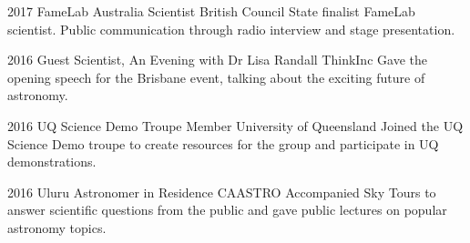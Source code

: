 \begin{entrylist}
\entry
    {2017}
    {FameLab Australia Scientist}
    {British Council}
    {State finalist FameLab scientist. Public communication through radio interview and stage presentation.}
\end{entrylist}
\begin{entrylist}
\entry
    {2016}
    {Guest Scientist, An Evening with Dr Lisa Randall}
    {ThinkInc}
    {Gave the opening speech for the Brisbane event, talking about the exciting future of astronomy.}
\end{entrylist}
\begin{entrylist}
\entry
    {2016}
    {UQ Science Demo Troupe Member}
    {University of Queensland}
    {Joined the UQ Science Demo troupe to create resources for the group and participate in UQ demonstrations.}
\end{entrylist}
\begin{entrylist}
\entry
    {2016}
    {Uluru Astronomer in Residence}
    {CAASTRO}
    {Accompanied Sky Tours to answer scientific questions from the public and gave public lectures on popular astronomy topics.}
\end{entrylist}



